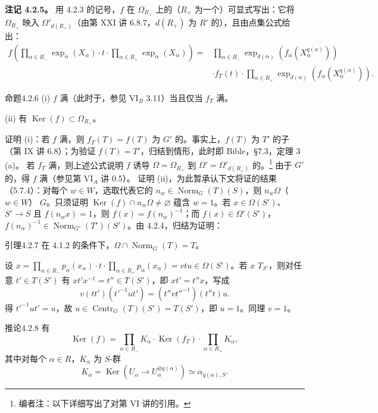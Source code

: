 \textbf{注记 4.2.5。} 用 4.2.3 的记号，$f$ 在 $\Omega_{R_+}$ 上的（$R_+$ 为一个）可显式写出：它将 $\Omega_{R_+}$ 映入 $\Omega'_{d(R_+)}$（由第 XXI 讲 6.8.7，$d(R_+)$ 为 $R'$ 的），且由点集公式给出：
\[\begin{aligned}
f\left(\prod_{\alpha\in R_-}\exp_\alpha(X_\alpha)\cdot t\cdot\prod_{\alpha\in R_+}\exp_\alpha(X_\alpha)\right)
={}&\prod_{\alpha\in R_-}\exp_{d(\alpha)}(f_\alpha(X_\alpha^{q(\alpha)}))\\&\cdot f_T(t)\cdot\prod_{\alpha\in R_+}\exp_{d(\alpha)}(f_\alpha(X_\alpha^{q(\alpha)})).
\end{aligned}\]
\begin{SGAresult}{命题}{4.2.6} (i) $f$ 满（此时于，参见 VI$_B$ 3.11）当且仅当 $f_T$ 满。

(ii) 有 $\operatorname{Ker}(f)\subset\Omega_{R_+}$。\end{SGAresult}
证明 (i)：若 $f$ 满，则 $f_T(T)=f(T)$ 为 $G'$ 的。事实上，$f(T)$ 为 $T'$ 的子（第 IX 讲 6.8）；为验证 $f(T)=T'$，归结到情形，此时即 Bible，§7.3，定理 3 (a)。
若 $f_T$ 满，则上述公式说明 $f$ 诱导 $\Omega=\Omega_{R_+}$ 到 $\Omega'=\Omega'_{d(R_+)}$ 的。\footnote{编者注：以下详细写出了对第 VI 讲的引用。} 由于 $G'$ 的，得 $f$ 满（参见第 VI$_A$ 讲 0.5）。
证明 (ii)，为此暂承认下文将证的结果（5.7.4）：对每个 $w\in W$，选取代表它的 $n_w\in\operatorname{Norm}_G(T)(S)$，则 $n_w\Omega$（$w\in W$） $G$。只须证明 $\operatorname{Ker}(f)\cap n_w\Omega\ne\varnothing$ 蕴含 $w=1$。若 $x\in\Omega(S')$、$S'\to S$ 且 $f(n_wx)=1$，则 $f(x)=f(n_w)^{-1}$；而 $f(x)\in\Omega'(S')$，$f(n_w)^{-1}\in\operatorname{Norm}_{G'}(T')(S')$。由 4.2.4，归结为证明：
\begin{SGAresult}{引理}{4.2.7} 在 4.1.2 的条件下，$\Omega\cap\operatorname{Norm}_G(T)=T$。\end{SGAresult}
设 $x=\prod_{\alpha\in R_-}p_\alpha(x_\alpha)\cdot t\cdot\prod_{\alpha\in R_+}p_\alpha(x_\alpha)=vtu\in\Omega(S')$。若 $x$  $T_{S'}$，则对任意 $t'\in T(S')$ 有 $xt'x^{-1}=t''\in T(S')$，即 $xt'=t''x$，写成
\[v(tt')(t'^{-1}ut')=(t''vt''^{-1})(t''t)u.\]
得 $t'^{-1}ut'=u$，故 $u\in\operatorname{Centr}_G(T)(S')=T(S')$，即 $u=1$。同理 $v=1$。
\begin{SGAresult}{推论}{4.2.8} 有
\[\operatorname{Ker}(f)=\prod_{\alpha\in R_-}K_\alpha\cdot\operatorname{Ker}(f_T)\cdot\prod_{\alpha\in R_+}K_\alpha,\]
其中对每个 $\alpha\in R$，$K_\alpha$ 为 $S$-群
\[K_\alpha=\operatorname{Ker}(U_\alpha\to U_\alpha^{\otimes q(\alpha)})\simeq\alpha_{q(\alpha),S}.\]
\end{SGAresult}
